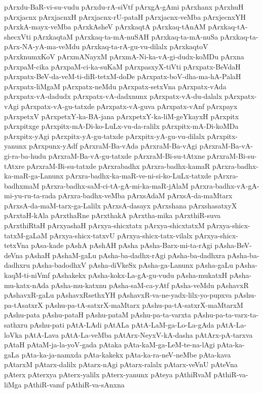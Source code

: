{pArxdu-BaR-vi-su-vudu
pArxdu-rA-siVtf
pArxgA-gAmi
pArxhanx
pArxhuH
pArxjacnx
pArxjacnxH
pArxjacnx-rU-pataH
pArxjacnx-veMba
pArxjecnxYH
pArxkA-mayx-veMba
pArxkAsheV
pArxkaqtA
pArxkaq-tAnAM
pArxkaq-tA-shecxVti
pArxkaqtaM
pArxkaq-ta-mA-nuSAH
pArxkaq-ta-mA-nuSa
pArxkaq-ta-pArx-NA-yA-ma-veMdu
pArxkaq-ta-rA-gu-vu-dilalx
pArxkaqtoV
pArxknumxKoV
pArxmANayxM
pArxmA-Ni-ka-vA-gi-dudx-koMDu
pArxna
pArxpaM-cika
pArxpaM-ci-ka-suKaM
pArxpasxyX-tiVti
pArxpatx-BeVdaH
pArxpatx-BeV-da-veM-ti-diR-tetxM-doDe
pArxpatx-boV-dha-ma-hA-PalaH
pArxpatx-liMgaM
pArxpatx-neMdu
pArxpatx-setxVna
pArxpatx-vAda
pArxpatx-vA-dadudx
pArxpatx-vA-dadxnunx
pArxpatx-vA-du-dalalx
pArxpatx-vAgi
pArxpatx-vA-gu-tatxde
pArxpatx-vA-guva
pArxpatx-vAnf
pArxpayx
pArxpetxV
pArxpetxY-ka-BA-jana
pArxpetxY-ka-liM-geYkayxH
pArxpitx
pArxpitxge
pArxpitx-mA-Di-ko-LuLx-vu-da-ralilx
pArxpitx-mA-Di-koMDa
pArxpitx-yAgi
pArxpitx-yA-gu-tatxde
pArxpitx-yA-gu-vu-dilalx
pArxpitx-yanunx
pArxpunx-yAdf
pArxraM-Ba-vAda
pArxraM-Ba-vAgi
pArxraM-Ba-vA-gi-ra-ba-hudu
pArxraM-Ba-vA-gu-tatxde
pArxraM-Bi-su-tAtxne
pArxraM-Bi-su-tAtxre
pArxraM-Bi-su-tatxde
pArxrabadhx
pArxra-badhx-kamaR
pArxra-badhx-ka-maR-ga-Lanunx
pArxra-badhx-ka-maR-ve-ni-si-ko-LuLx-tatxde
pArxra-badhxmaM
pArxra-badhx-saM-ci-tA-gA-mi-ka-maR-jAlaM
pArxra-badhx-vA-gA-mi-yu-ru-ta-rada
pArxra-badhx-veMba
pArxsAdaM
pArxsA-da-maMtarx
pArxsA-da-maM-tarx-ga-Lalilx
pArxsA-dasayx
pArxshana
pArxshasatxyX
pArxtaH-kAla
pArxthaRne
pArxthakA
pArxtha-mika
pArxthiR-suva
pArxthiRtaH
pArxyashaH
pArxya-shicxtatx
pArxya-shicxtatxM
pArxya-shicx-tatxM-gaLaM
pArxya-shicx-tatxvU
pArxya-shicx-tatx-vilalx
pArxya-shicx-tetxVna
pAsa-kade
pAshA
pAshAH
pAsha
pAsha-Barx-mi-ta-rAgi
pAsha-BeV-deVna
pAshaH
pAshaM-gaLu
pAsha-ba-dadhx-rAgi
pAsha-ba-dadhxra
pAsha-ba-dadhxru
pAsha-badodhxV
pAsha-diVkeSx
pAsha-ga-Lanunx
pAsha-gaLu
pAsha-kaqM-ti-niVmf
pAshakekx
pAsha-kokx-La-gA-gu-vudu
pAsha-mukatxH
pAsha-mu-katx-nAda
pAsha-mu-katxnu
pAsha-saM-ca-yAtf
pAsha-veMdu
pAshavxR
pAshavxR-gaLu
pAshavxRsethxYH
pAshavxR-va-ne-yadx-lilx-yo-pupxva
pAshu-pa-tAsatxrX
pAshu-pa-tA-satxrX-maMtarx
pAshu-pa-tA-satxrX-maMtarxM
pAshu-pata
pAshu-pataH
pAshu-pataM
pAshu-pa-ta-varxta
pAshu-pa-ta-varx-ta-sathxru
pAshu-pati
pAtA-LAdi
pAtALa
pAtA-LaM-ga-Lo-La-gAda
pAtA-La-loVka
pAtA-Lava
pAtA-La-veMba
pAtArx-NeyxV-kA-dasha
pAtArx-pA-tarxva
pAtaH
pAtaM-ja-la-yoV-gada
pAtaka
pAta-kaM-ga-LeM-te-na-lAgi
pAta-ka-gaLa
pAta-ka-ja-namxda
pAta-kakekx
pAta-ka-ra-neV-neMbe
pAta-kava
pAtarxM
pAtarx-dalilx
pAtarx-nAgi
pAtarx-ralalx
pAtarx-veVnU
pAteVna
pAterx
pAterxya
pAterx-yalilx
pAterx-yanunx
pAteya
pAthiRvaM
pAthiR-va-liMga
pAthiR-vamf
pAthiR-va-sAnxna
}
